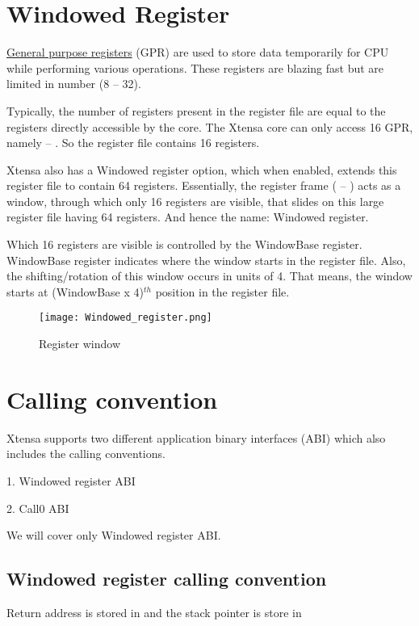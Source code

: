 \section{Windowed Register}

\underline{General purpose registers} (GPR) are used to store data temporarily for CPU while performing various operations. These registers are blazing fast but are limited in number (8 -- 32).

Typically, the number of registers present in the register file are equal to the registers directly accessible by the core. The Xtensa core can only access 16 GPR, namely  -- . So the register file contains 16 registers.

Xtensa also has a Windowed register option, which when enabled, extends this register file to contain 64 registers. Essentially, the register frame ( -- ) acts as a window, through which only 16 registers are visible, that slides on this large register file having 64 registers. And hence the name: Windowed register.

Which 16 registers are visible is controlled by the WindowBase register. WindowBase register indicates where the window starts in the register file. Also, the shifting/rotation of this window occurs in units of 4. That means, the window starts at (WindowBase x 4)$^{th}$ position in the register file.

\begin{figure}[p]
    \center
    \texttt{[image: Windowed\_register.png]}
    \caption{Register window}
    \label{fig:register-window}
\end{figure}

\section{Calling convention}

Xtensa supports two different application binary interfaces (ABI) which also includes the calling conventions.

1. Windowed register ABI

2. Call0 ABI

We will cover only Windowed register ABI.

\subsection{Windowed register calling convention}

Return address is stored in  and the stack pointer is store in 

